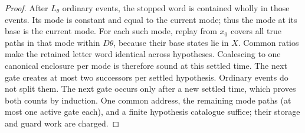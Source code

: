 \begin{proof}
After $L_\theta$ ordinary events, the stopped word is contained wholly
in those events. Its mode is constant and equal to the current mode;
thus the mode at its base is the current mode. For each such mode, replay
from $x_0$ covers all true paths in that mode within $D\theta$, because
their base states lie in $X$. Common ratios make the retained letter word
identical across hypotheses. Coalescing to one canonical enclosure per
mode is therefore sound at this settled time.
The next gate creates at most two successors per settled hypothesis.
Ordinary events do not split them. The next gate occurs only after a new
settled time, which proves both counts by induction. One common address,
the remaining mode paths (at most one active gate each), and a finite
hypothesis catalogue suffice; their storage and guard work are charged.
\end{proof}
